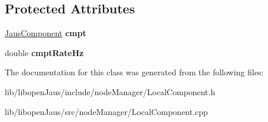 \subsection*{\-Protected \-Attributes}
\begin{DoxyCompactItemize}
\item 
\hypertarget{class_local_component_af59d31a2a67fdc7a9ccc23f67806cce0}{\hyperlink{struct_jaus_component_struct}{\-Jaus\-Component} {\bfseries cmpt}}\label{class_local_component_af59d31a2a67fdc7a9ccc23f67806cce0}

\item 
\hypertarget{class_local_component_a886e947a0c4ffe01bb444b792f1d9ecf}{double {\bfseries cmpt\-Rate\-Hz}}\label{class_local_component_a886e947a0c4ffe01bb444b792f1d9ecf}

\end{DoxyCompactItemize}


\-The documentation for this class was generated from the following files\-:\begin{DoxyCompactItemize}
\item 
lib/libopen\-Jaus/include/node\-Manager/\-Local\-Component.\-h\item 
lib/libopen\-Jaus/src/node\-Manager/\-Local\-Component.\-cpp\end{DoxyCompactItemize}

